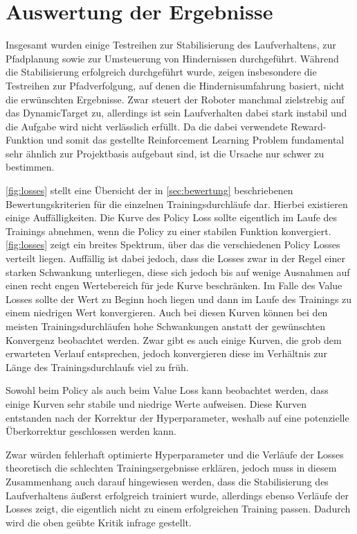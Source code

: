 \chapter{Auswertung der Ergebnisse}
Insgesamt wurden einige Testreihen zur Stabilisierung des Laufverhaltens, zur Pfadplanung sowie zur Umsteuerung von Hindernissen durchgeführt.
Während die Stabilisierung erfolgreich durchgeführt wurde, zeigen insbesondere die Testreihen zur Pfadverfolgung, auf denen die Hindernisumfahrung basiert, nicht die erwünschten Ergebnisse.
Zwar steuert der Roboter manchmal zielstrebig auf das DynamicTarget zu, allerdings ist sein Laufverhalten dabei stark instabil und die Aufgabe wird nicht verlässlich erfüllt.
Da die dabei verwendete Reward-Funktion und somit das gestellte Reinforcement Learning Problem fundamental sehr ähnlich zur Projektbasis \cite{waidner.2020} aufgebaut sind, ist die Ursache nur schwer zu bestimmen.

\autoref{fig:losses} stellt eine Übersicht der in \autoref{sec:bewertung} beschriebenen Bewertungskriterien für die einzelnen Trainingsdurchläufe dar.
Hierbei existieren einige Auffälligkeiten.
Die Kurve des Policy Loss sollte eigentlich im Laufe des Trainings abnehmen, wenn die Policy zu einer stabilen Funktion konvergiert.
\autoref{fig:losses} zeigt ein breites Spektrum, über das die verschiedenen Policy Losses verteilt liegen.
Auffällig ist dabei jedoch, dass die Losses zwar in der Regel einer starken Schwankung unterliegen, diese sich jedoch bis auf wenige Ausnahmen auf einen recht engen Wertebereich für jede Kurve beschränken.
Im Falle des Value Losses sollte der Wert zu Beginn hoch liegen und dann im Laufe des Trainings zu einem niedrigen Wert konvergieren.
Auch bei diesen Kurven können bei den meisten Trainingsdurchläufen hohe Schwankungen anstatt der gewünschten Konvergenz beobachtet werden.
Zwar gibt es auch einige Kurven, die grob dem erwarteten Verlauf entsprechen, jedoch konvergieren diese im Verhältnis zur Länge des Trainingsdurchlaufs viel zu früh.

Sowohl beim Policy als auch beim Value Loss kann beobachtet werden, dass einige Kurven sehr stabile und niedrige Werte aufweisen.
Diese Kurven entstanden nach der Korrektur der Hyperparameter, weshalb auf eine potenzielle Überkorrektur geschlossen werden kann.

Zwar würden fehlerhaft optimierte Hyperparameter und die Verläufe der Losses theoretisch die schlechten Trainingsergebnisse erklären, jedoch muss in diesem Zusammenhang auch darauf hingewiesen werden, dass die Stabilisierung des Laufverhaltens äußerst erfolgreich trainiert wurde, allerdings ebenso Verläufe der Losses zeigt, die eigentlich nicht zu einem erfolgreichen Training passen.
Dadurch wird die oben geübte Kritik infrage gestellt.

